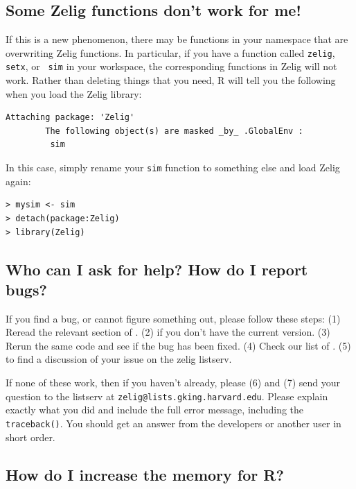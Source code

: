 \subsection*{Some Zelig functions don't work for me!}

If this is a new phenomenon, there may be functions in your
namespace that are overwriting Zelig functions.  In particular, if you
have a function called {\tt zelig}, {\tt setx}, or {\tt
sim} in your workspace, the corresponding functions in Zelig will not
work.  Rather than deleting things that you need, R will tell you the
following when you load the Zelig library:
\begin{verbatim}
Attaching package: 'Zelig'
        The following object(s) are masked _by_ .GlobalEnv :
         sim 
\end{verbatim}
In this case, simply rename your {\tt sim} function to something else
and load Zelig again: 
\begin{verbatim}
> mysim <- sim
> detach(package:Zelig)     
> library(Zelig)
\end{verbatim}

\subsection*{Who can I ask for help?  How do I report bugs?}

If you find a bug, or cannot figure something out, please follow these
steps: (1) Reread the relevant section of .  (2)
 if you
don't have the current version.  (3) Rerun the same code and see if
the bug has been fixed.  (4) Check our list
of .
(5)  to find a
discussion of your issue on the zelig listserv.

If none of these work, then if you haven't already, please (6)
 and
(7) send your question to the listserv at
\texttt{zelig@lists.gking.harvard.edu}.  Please explain exactly what you did
and include the full error message, including the {\tt traceback()}.
You should get an answer from the developers or another user in short
order.

\subsection*{How do I increase the memory for R?}

